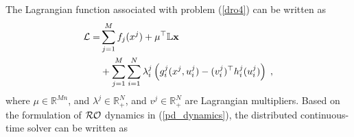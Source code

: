\documentclass[journal,twoside,web]{ieeecolor}
\begin{document}
The Lagrangian function associated with problem (\ref{dro4}) can be written as
\begin{align*}
{\cal L}=&\sum_{j=1}^M f_j(x^j)+\mu^\top \mathbb{L}\mathbf{x}\\
&+\sum_{j=1}^M \sum_{i=1}^N \lambda_i^j \left(g_i^j(x^j,u_i^j)-(v_i^j)^\top h_i^j(u_i^j)\right)\;,
\end{align*}
where $\mu \in \mathbb{R}^{Mn}$, and $\lambda^j \in \mathbb{R}_+^N$, and $v^j \in \mathbb{R}_+^N$ are Lagrangian multipliers. Based on the formulation of ${\cal RO}$ dynamics in (\ref{pd_dynamics}), the distributed continuous-time solver can be written as
\end{document}
